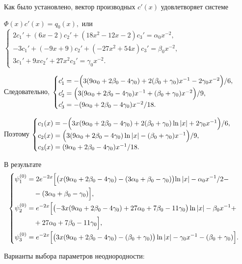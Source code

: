 \documentclass[11pt]{article}
\begin{document}
{%
Как было установлено, вектор производных $c'(x)$ удовлетворяет системе

\smallskip
$\Phi(x)c'(x)=q_0(x),$ 
или
$\begin{cases}
2c_1' + (6x - 2)c_2' + (18x^2 - 12x - 2)c_3' = \alpha_0 x^{-2}, \\
-3c_1' + (-9x + 9)c_2' + (-27x^2 + 54x)c_3' = \beta_0 x^{-2}, \\
3c_1' + 9x c_2' + 27x^2 c_3' = \gamma_0 x^{-2}.
\end{cases}$

Следовательно, 
$\begin{cases} c_1' = -\Bigl( 3(9\alpha_0 + 2\beta_0 -4\gamma_0) + 2(\beta_0 + \gamma_0) x^{-1} - 2\gamma_0 x^{-2} \Bigl)/6,\\ 
c_2' = \Bigl(3(9\alpha_0 + 2\beta_0 - 4\gamma_0)x^{-1} + (\beta_0 + \gamma_0)x^{-2}\Bigl)/9,\\  
c_3' = -(9\alpha_0 + 2\beta_0 - 4\gamma_0)x^{-2}/18.\end{cases}$

Поэтому 
$\begin{cases} 
c_1(x) = -\Bigl(3x (9\alpha_0 + 2\beta_0 - 4\gamma_0) + 2(\beta_0 + \gamma_0) \ln|x| + 2\gamma_0 x^{-1} \Bigl)/6,\\ 
c_2(x) = \Bigl(3(9\alpha_0 + 2\beta_0 - 4\gamma_0)\ln |x| - (\beta_0 + \gamma_0)x^{-1}\Bigl)/9,\\ 
c_3(x) = (9\alpha_0 + 2\beta_0 - 4\gamma_0)x^{-1}/18.\end{cases}$

В результате 
\[
\begin{cases}
\begin{aligned}
\psi_1^{(0)} &= 2e^{-2x} \Bigl[ \bigl( x(9\alpha_0 + 2\beta_0 -4\gamma_0)-(3\alpha_0+\beta_0-\gamma_0 )\bigl)\ln |x| - 
  \alpha_0 x^{-1}/2 - \\
&\quad - (3\alpha_0 +\beta_0 - \gamma_0) \Bigr], \\
\psi_2^{(0)} &= e^{-2x} \Bigl[ \bigl( -3x(9\alpha_0 + 2\beta_0 - 4\gamma_0)+27\alpha_0 +7\beta_0 -11\gamma_0 \bigr)\ln |x| - 
   \beta_0 x^{-1} + \\
&\quad + 27\alpha_0 + 7\beta_0 -11\gamma_0 \Bigr], \\
\psi_3^{(0)} &= e^{-2x} \Bigl[ \bigl( 3x(9\alpha_0 + 2\beta_0 - 4\gamma_0) -(\beta_0 +\gamma_0)  \bigr)\ln |x| - 
\gamma_0x^{-1} -(\beta_0 +\gamma_0) \Bigr].
\end{aligned}
\end{cases}
\]

Варианты выбора параметров неоднородности:

}
\end{document}
